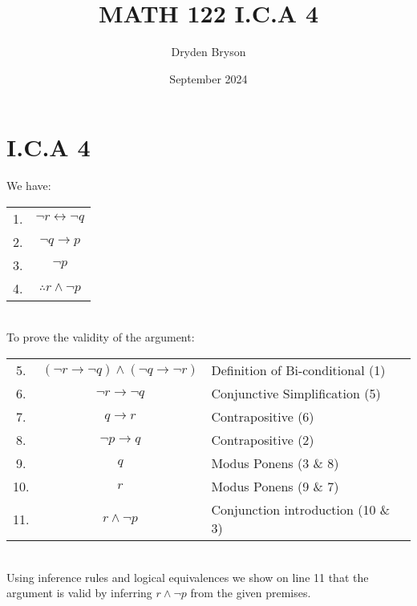 \documentclass{article}
\title{MATH 122 I.C.A 4}
\author{Dryden Bryson}
\date{September 2024}
\begin{document}
\maketitle
\newpage
\section*{I.C.A 4}
We have:

\begin{table}[htp]
\centering
    \begin{tabular}{cc}
       1. & $\neg r\leftrightarrow \neg q$\\ 
       2. & $\neg q\to p$ \\ 
       3. & $\neg p$ \\ 
        \hline
       4. & $\therefore r\land \neg p$
    \end{tabular}
\end{table}
 \\
To prove the validity of the argument:

\begin{table}[htp]
    \centering
    \begin{tabular}{ccl}
       5.  & $(\lnot r\rightarrow \lnot q) \land (\lnot q\rightarrow \lnot r)$ & Definition of Bi-conditional (1)\\
       6.  & $\lnot r \rightarrow \lnot q$ & Conjunctive Simplification (5)\\
       7.  & $q\rightarrow r$ & Contrapositive (6)\\
       8.  & $\lnot p \rightarrow q$ & Contrapositive (2)\\
       9.  & $q$ & Modus Ponens (3 \& 8)\\
       10. & $r$ & Modus Ponens (9 \& 7)\\
       11. & $r \land \lnot p$ & Conjunction introduction (10 \& 3)\\
    \end{tabular}
\end{table}
 \\
Using inference rules and logical equivalences we show on line 11 that the argument is valid by inferring $r \land \lnot p$ from the given premises. 
\end{document}
